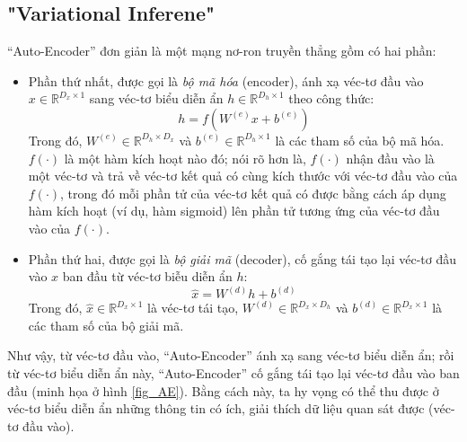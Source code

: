 \subsection{"Variational Inferene"}
``Auto-Encoder'' đơn giản là một mạng nơ-ron truyền thẳng gồm có hai phần: 
\begin{itemize}
	\item Phần thứ nhất, được gọi là \emph{bộ mã hóa} (encoder), ánh xạ véc-tơ đầu vào $x \in \mathbb{R}^{D_x \times 1}$ sang véc-tơ biểu diễn ẩn $h \in \mathbb{R}^{D_h \times 1}$ theo công thức: 
	\begin{equation}
		h=f(W^{(e)}x + b^{(e)})
	\end{equation}
	Trong đó, $W^{(e)} \in \mathbb{R}^{D_h \times D_x}$ và $b^{(e)} \in \mathbb{R}^{D_h \times 1}$ là các tham số của bộ mã hóa. $f(\cdot)$ là một hàm kích hoạt nào đó; nói rõ hơn là, $f(\cdot)$ nhận đầu vào là một véc-tơ và trả về véc-tơ kết quả có cùng kích thước với véc-tơ đầu vào của $f(\cdot)$, trong đó mỗi phần tử của véc-tơ kết quả có được bằng cách áp dụng hàm kích hoạt (ví dụ, hàm sigmoid) lên phần tử tương ứng của véc-tơ đầu vào của $f(\cdot)$.
	\item Phần thứ hai, được gọi là \emph{bộ giải mã} (decoder), cố gắng tái tạo lại véc-tơ đầu vào $x$ ban đầu từ véc-tơ biễu diễn ẩn $h$:
	\begin{equation}
		\hat{x} = W^{(d)}h + b^{(d)}
	\end{equation}
	Trong đó, $\hat{x} \in \mathbb{R}^{D_x \times 1}$ là véc-tơ tái tạo, $W^{(d)} \in \mathbb{R}^{D_x \times D_h}$ và $b^{(d)} \in \mathbb{R}^{D_x \times 1}$ là các tham số của bộ giải mã.
\end{itemize}

Như vậy, từ véc-tơ đầu vào, ``Auto-Encoder'' ánh xạ sang véc-tơ biểu diễn ẩn; rồi từ véc-tơ biểu diễn ẩn này, ``Auto-Encoder'' cố gắng tái tạo lại véc-tơ đầu vào ban đầu (minh họa ở hình \ref{fig_AE}). Bằng cách này, ta hy vọng có thể thu được ở véc-tơ biểu diễn ẩn những thông tin có ích, giải thích dữ liệu quan sát được (véc-tơ đầu vào).


